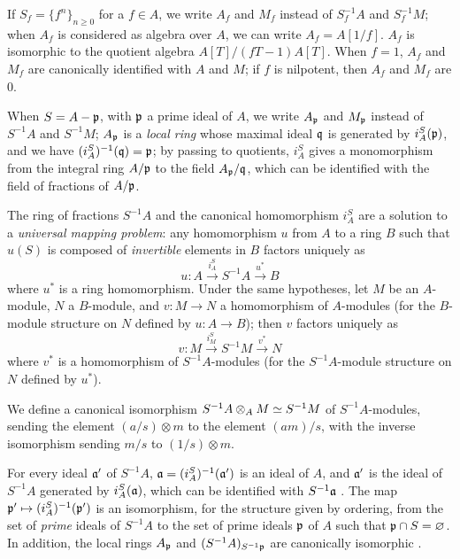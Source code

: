 \begin{env}[1.2.3]
\label{0.1.2.3}
If $S_f=\{f^n\}_{n\geq 0}$ for a $f\in A$, we write $A_f$ and $M_f$ instead
of $S_f^{-1}A$ and $S_f^{-1}M$; when $A_f$ is considered as algebra over $A$, we
can write $A_f=A[1/f]$. $A_f$ is isomorphic to the quotient algebra
$A[T]/(fT-1)A[T]$. When $f=1$, $A_f$ and $M_f$ are canonically identified with $A$ and
$M$; if $f$ is nilpotent, then $A_f$ and $M_f$ are $0$.

When $S=A-\mathfrak{p}$, with $\mathfrak{p}$ a prime ideal of $A$, we write
$A_\mathfrak{p}$ and $M_\mathfrak{p}$ instead of $S^{-1}A$ and $S^{-1}M$;
$A_\mathfrak{p}$ is a \emph{local ring} whose maximal ideal $\mathfrak{q}$ is
generated by $i_A^S(\mathfrak{p})$, and we have
$(i_A^S)^{-1}(\mathfrak{q})=\mathfrak{p}$; by passing to quotients, $i_A^S$
gives a monomorphism from the integral ring $A/\mathfrak{p}$ to the field
$A_\mathfrak{p}/\mathfrak{q}$, which can be identified with the field of fractions of
$A/\mathfrak{p}$.
\end{env}

\begin{env}[1.2.4]
\label{0.1.2.4}
The ring of fractions $S^{-1}A$ and the canonical homomorphism $i_A^S$ are a
solution to a \emph{universal mapping problem}: any homomorphism $u$ from $A$ to
a ring $B$ such that $u(S)$ is composed of \emph{invertible} elements in $B$
factors uniquely as
\[
  u:A\xrightarrow{i_A^S}S^{-1}A\xrightarrow{u^*}B
\]
where
$u^*$ is a ring homomorphism.
Under the same hypotheses, let $M$ be an $A$-module, $N$ a $B$-module, and $v:M\to N$ a homomorphism of $A$-modules (for the $B$-module structure on $N$ defined by $u:A\to B$); then $v$ factors uniquely as
\[
  v:M\xrightarrow{i_M^S}S^{-1}M\xrightarrow{v^*}N
\]
where $v^*$ is a homomorphism of $S^{-1}A$-modules (for the $S^{-1}A$-module structure on $N$ defined by $u^*$).
\end{env}

\begin{env}[1.2.5]
\label{0.1.2.5}
We define a canonical isomorphism $S^{-1}A\otimes_A M\simeq S^{-1}M$ of $S^{-1}A$-modules, sending the element $(a/s)\otimes m$ to the element $(am)/s$, with the inverse isomorphism sending $m/s$ to $(1/s)\otimes m$.
\end{env}

\begin{env}[1.2.6]
\label{0.1.2.6}
For every ideal $\mathfrak{a}'$ of $S^{-1}A$, $\mathfrak{a}=(i_A^S)^{-1}(\mathfrak{a}')$ is an ideal of $A$, and
$\mathfrak{a}'$ is the ideal of $S^{-1}A$ generated by $i_A^S(\mathfrak{a})$,
which can be identified with $S^{-1}\mathfrak{a}$ . The map
$\fk{p}'\mapsto(i_A^S)^{-1}(\fk{p}')$ is an isomorphism, for the structure given by ordering, from the set of \emph{prime} ideals of $S^{-1}A$ to the set of
prime ideals $\mathfrak{p}$ of $A$ such that $\mathfrak{p}\cap S=\varnothing$. In
addition, the local rings $A_\mathfrak{p}$ and $(S^{-1}A)_{S^{-1}\mathfrak{p}}$
are canonically isomorphic .
\end{env}

